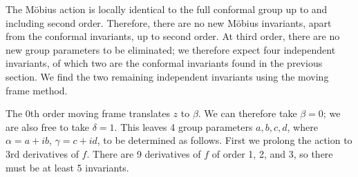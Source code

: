 \documentclass{article}
\begin{document}
The M\"obius action is locally identical to the full conformal group up to and including second order. Therefore, there are no new M\"obius invariants, apart from the conformal invariants, up to second order. At third order, there are no new group parameters
to be eliminated; we therefore expect four independent invariants, of which two are the conformal invariants found in the previous section. We find the two remaining independent invariants using the moving frame method.

The 0th order moving frame translates $z$ to
$\beta$. We can therefore take $\beta=0$; we are also free to take $\delta=1$. This leaves 4 group parameters $a,b,c,d$, where $\alpha = a + i b$, $\gamma = c + i d$,
to be determined as follows. First we prolong the action to 3rd derivatives of $f$. There are 9 derivatives of
$f$ of order 1, 2, and 3, so there must be at least 5 invariants.
\end{document}
